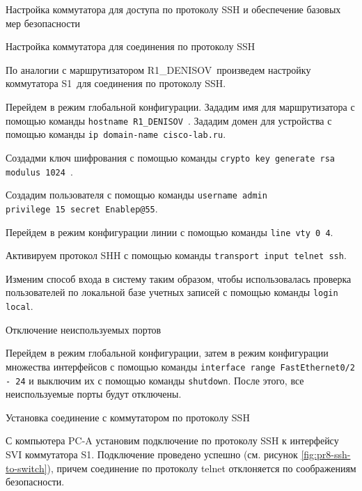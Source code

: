 \documentclass[a4paper,14pt]{extarticle}
\newcommand{\router}{R1\_DENISOV~}
\newcommand{\switch}{S1~}
\begin{document}
\begin{mypart}{Настройка коммутатора для доступа по протоколу SSH и
		обеспечение базовых мер безопасности}
\begin{step}{Настройка коммутатора для соединения по протоколу SSH}
		
		По аналогии с маршрутизатором \router произведем настройку коммутатора \switch для соединения по протоколу SSH. 
		
		Перейдем в режим глобальной конфигурации.
		Зададим имя для маршрутизатора с помощью команды \texttt{hostname \router}.
		Зададим домен для устройства с помощью команды \texttt{ip domain-name cisco-lab.ru}.
		
		Создадми ключ шифрования с помощью команды \texttt{crypto key generate rsa modulus 1024 }.
	
		Создадим пользователя с помощью команды \texttt{username admin \\privilege 15 secret Enablep@55}.

		Перейдем в режим конфигурации линии с помощью команды \texttt{line vty 0 4}.
		
		Активируем протокол SHH с помощью команды \texttt{transport input telnet ssh}.

		Изменим способ входа в систему таким образом, чтобы использовалась проверка пользователей
		по локальной базе учетных записей с помощью команды \texttt{login local}.

	\end{step}

\begin{step}{Отключение неиспользуемых портов}
	
		Перейдем в режим глобальной конфигурации, затем в режим конфигурации множества интерфейсов с помощью команды \texttt{interface range FastEthernet0/2 - 24} и выключим их с помощью команды \texttt{shutdown}. После этого, все неиспользуемые порты будут отключены.
\end{step}

\begin{step}{Установка соединение с коммутатором по протоколу SSH}

	С компьютера PC-A установим подключение по протоколу SSH к интерфейсу SVI коммутатора S1.
	Подключение проведено успешно (см. рисунок \ref{fig:pr8-ssh-to-switch}), причем соединение по протоколу telnet отклоняется по соображениям безопасности.
	

\end{step}
\end{mypart}
\end{document}
